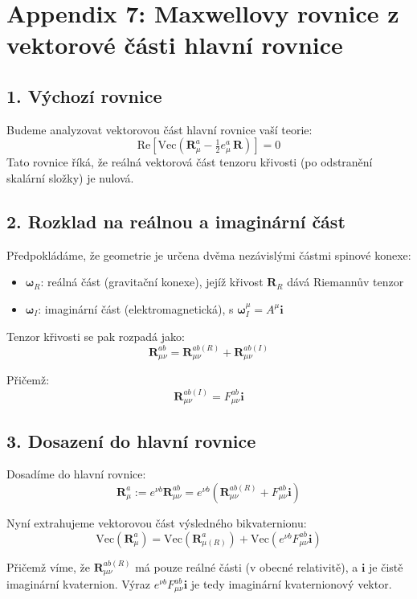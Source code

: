 \section*{Appendix 7: Maxwellovy rovnice z vektorové části hlavní rovnice}

\subsection*{1. Výchozí rovnice}

Budeme analyzovat vektorovou část hlavní rovnice vaší teorie:
\[
\text{Re}\left[\text{Vec}\left(\mathbf{R}^a_\mu - \tfrac{1}{2} e^a_\mu \, \mathbf{R}\right)\right] = 0
\]
Tato rovnice říká, že reálná vektorová část tenzoru křivosti (po odstranění skalární složky) je nulová.

\subsection*{2. Rozklad na reálnou a imaginární část}

Předpokládáme, že geometrie je určena dvěma nezávislými částmi spinové konexe:
\begin{itemize}
\item $\boldsymbol{\omega}_R$: reálná část (gravitační konexe), jejíž křivost $\mathbf{R}_R$ dává Riemannův tenzor
\item $\boldsymbol{\omega}_I$: imaginární část (elektromagnetická), s $\boldsymbol{\omega}_I^\mu = A^\mu \mathbf{i}$
\end{itemize}

Tenzor křivosti se pak rozpadá jako:
\[
\mathbf{R}_{\mu\nu}^{ab} = \mathbf{R}_{\mu\nu}^{ab (R)} + \mathbf{R}_{\mu\nu}^{ab (I)}
\]

Přičemž:
\[
\mathbf{R}_{\mu\nu}^{ab (I)} = F_{\mu\nu}^{ab} \mathbf{i}
\]

\subsection*{3. Dosazení do hlavní rovnice}

Dosadíme do hlavní rovnice:
\[
\mathbf{R}^a_\mu := e^{\nu b} \mathbf{R}_{\mu\nu}^{ab} = e^{\nu b} \left( \mathbf{R}_{\mu\nu}^{ab (R)} + F_{\mu\nu}^{ab} \mathbf{i} \right)
\]

Nyní extrahujeme vektorovou část výsledného bikvaternionu:
\[
\text{Vec}(\mathbf{R}^a_\mu) = \text{Vec}(\mathbf{R}^{a}_{\mu (R)}) + \text{Vec}(e^{\nu b} F_{\mu\nu}^{ab} \mathbf{i})
\]

Přičemž víme, že $\mathbf{R}_{\mu\nu}^{ab (R)}$ má pouze reálné části (v obecné relativitě), a $\mathbf{i}$ je čistě imaginární kvaternion. Výraz $e^{\nu b} F_{\mu\nu}^{ab} \mathbf{i}$ je tedy imaginární kvaternionový vektor.

